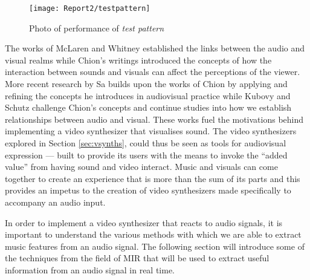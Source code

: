 \documentclass[../initial_thesis.tex]{subfiles}
\begin{document}
\begin{figure}[h]
  \texttt{[image: Report2/testpattern]}
  \centering
  \caption{Photo of performance of \textit{test pattern} \cite{Ikeda}}
  \label{fig:testpattern}
\end{figure}

The works of McLaren and Whitney established the links between the audio and visual realms while Chion's writings introduced the concepts of how the interaction between sounds and visuals can affect the perceptions of the viewer. More recent research by Sa builds upon the works of Chion by applying and refining the concepts he introduces in audiovisual practice while Kubovy and Schutz challenge Chion's concepts and continue studies into how we establish relationships between audio and visual. These works fuel the motivations behind implementing a video synthesizer that visualises sound. The video synthesizers explored in Section \ref{sec:vsynths}, could thus be seen as tools for audiovisual expression --- built to provide its users with the means to invoke the ``added value'' from having sound and video interact. Music and visuals can come together to create an experience that is more than the sum of its parts and this provides an impetus to the creation of video synthesizers made specifically to accompany an audio input. \par

In order to implement a video synthesizer that reacts to audio signals, it is important to understand the various methods with which we are able to extract music features from an audio signal. The following section will introduce some of the techniques from the field of MIR that will be used to extract useful information from an audio signal in real time.
\end{document}
